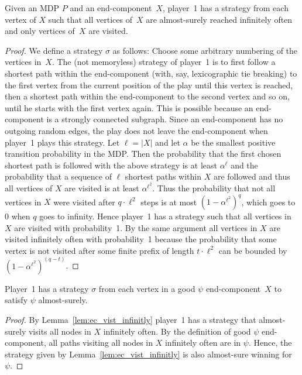 \documentclass[11pt,letterpaper]{article}
\newcommand{\str}{\sigma\xspace}
\newcommand{\obj}{\psi\xspace}
\newcommand{\mdp}{P\xspace}
\newcommand{\ec}{X\xspace}
\begin{document}
\begin{lemma}\label{lem:ec_vist_infinitly}
  Given an MDP $\mdp$ and an end-component~$\ec$, player~1 has a strategy
  from each vertex of $\ec$ such that all vertices of~$\ec$ are 
  almost-surely reached infinitely often
  and only vertices of~$\ec$ are visited. 
\end{lemma}
\begin{proof}
  We define a strategy $\str$ as follows: 
  Choose some arbitrary numbering of the vertices in~$\ec$. The (not memoryless)
  strategy of player~1 is to first follow a shortest path within the end-component
  (with, say, lexicographic tie breaking) to the first vertex from the current 
  position of the play until this vertex is reached, then a shortest path 
  within the end-component to the 
  second vertex and so on, until he starts with the first vertex again. This is
  possible because an end-component is a strongly connected subgraph. 
  Since an end-component has no outgoing random edges, the 
  play does not leave the end-component when player~1 plays this strategy.
  Let $\ell = \lvert \ec \rvert$ and let $\alpha$ be the smallest
  positive transition probability in the MDP. Then the probability that the first 
  chosen shortest path is followed with the above strategy 
  is at least $\alpha^\ell$ and the 
  probability that a sequence of $\ell$ shortest paths within $\ec$ are followed 
  and thus all vertices of $\ec$ are visited is at least $\alpha^{\ell^2}$. Thus 
  the probability that not all 
  vertices in $\ec$ were visited after $q \cdot \ell^2$ steps is at most $(1 - 
  \alpha^{\ell^2})^q$, which goes to 0 when $q$ goes to infinity. Hence player~1
  has a strategy such that all vertices in $\ec$ are visited with probability~1.
  By the same argument all vertices in $\ec$ are visited infinitely often with 
  probability~1 because the probability that some vertex is not visited after 
  some finite prefix of length $t \cdot \ell^2$ can be bounded by $(1 - \alpha^{\ell^2})^{(q - t)}$.
\end{proof}

\begin{lemma}\label{lem:wingood}
  Player~1 has a strategy $\str$ from each vertex in a good $\obj$ end-component~$\ec$
  to satisfy $\obj$ almost-surely.
\end{lemma}
\begin{proof}
  By Lemma~\ref{lem:ec_vist_infinitly} player~1 has a strategy that almost-surely visits
  all nodes in $\ec$ infinitely often. By the definition of good $\obj$ end-component, 
  all paths visiting all nodes in $\ec$ infinitely often are in $\obj$.
  Hence, the strategy given by Lemma~\ref{lem:ec_vist_infinitly} is also almost-sure winning for~$\obj$.
\end{proof}
\end{document}
